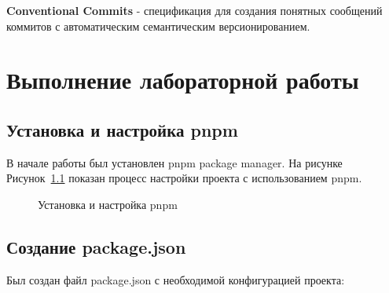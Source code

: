 \documentclass[
  12pt,
  a4paper,
  DIV=11,
  numbers=noendperiod]{scrreprt}
\begin{document}
\textbf{Conventional Commits} - спецификация для создания понятных
сообщений коммитов с автоматическим семантическим версионированием.

\chapter{Выполнение лабораторной
работы}\label{ux432ux44bux43fux43eux43bux43dux435ux43dux438ux435-ux43bux430ux431ux43eux440ux430ux442ux43eux440ux43dux43eux439-ux440ux430ux431ux43eux442ux44b}

\section{Установка и настройка
pnpm}\label{ux443ux441ux442ux430ux43dux43eux432ux43aux430-ux438-ux43dux430ux441ux442ux440ux43eux439ux43aux430-pnpm}

В начале работы был установлен pnpm package manager. На рисунке
Рисунок~\ref{fig-pnpm} показан процесс настройки проекта с
использованием pnpm.

\begin{figure}


\caption{\label{fig-pnpm}Установка и настройка pnpm}

\end{figure}%

\section{Создание
package.json}\label{ux441ux43eux437ux434ux430ux43dux438ux435-package.json}

Был создан файл package.json с необходимой конфигурацией проекта:
\end{document}
